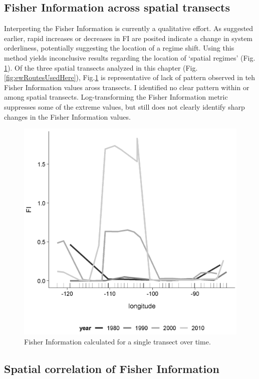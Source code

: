 \documentclass[12pt,twoside,openany]{reedthesis}
\begin{document}
\hypertarget{fisher-information-across-spatial-transects}{%
\subsection{Fisher Information across spatial transects}\label{fisher-information-across-spatial-transects}}

Interpreting the Fisher Information is currently a qualitative effort. As suggested earlier, rapid increases or decreases in FI are posited indicate a change in system orderliness, potentially suggesting the location of a regime shift. Using this method yields inconclusive results regarding the location of `spatial regimes' (Fig. \ref{fig:fi1Tsect}). Of the three spatial transects analyzed in this chapter (Fig. \ref{fig:ewRoutesUsedHere}), Fig.\ref{fig:fi1Tsect} is representative of lack of pattern observed in teh Fisher Information values aross transects. I identified no clear pattern within or among spatial transects. Log-transforming the Fisher Information metric suppresses some of the extreme values, but still does not clearly identify sharp changes in the Fisher Information values.
\begin{figure}
\includegraphics[width=0.85\linewidth]{./chapterFiles/fisherSpatial/figures/figsCalledInDiss/transect_12_East-West_metric_FI_Eqn7_12} \caption{Fisher Information calculated for a single transect over time.}\label{fig:fi1Tsect}
\end{figure}
\hypertarget{spatial-correlation-of-fisher-information-1}{%
\subsection{Spatial correlation of Fisher Information}\label{spatial-correlation-of-fisher-information-1}}
\end{document}
